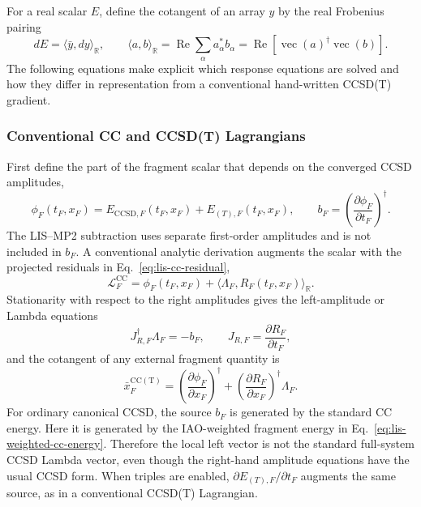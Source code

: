 \documentclass[11pt]{article}
\begin{document}
For a real scalar $E$, define the cotangent of an array $y$ by the real
Frobenius pairing
\begin{equation}
 dE=\langle\bar y,dy\rangle_{\mathbb R},
 \qquad
 \langle a,b\rangle_{\mathbb R}
 =\operatorname{Re}\sum_\alpha a_\alpha^*b_\alpha
 =\operatorname{Re}\!\left[\operatorname{vec}(a)^\dagger
                              \operatorname{vec}(b)\right].
 \label{eq:cc-real-cotangent}
\end{equation}
The following equations make explicit which response equations are solved and
how they differ in representation from a conventional hand-written
CCSD(T) gradient.

\subsubsection{Conventional CC and CCSD(T) Lagrangians}

First define the part of the fragment scalar that depends on the converged
CCSD amplitudes,
\begin{equation}
 \phi_F(t_F,x_F)=E_{\mathrm{CCSD},F}(t_F,x_F)
                  +E_{(T),F}(t_F,x_F),
 \qquad
 b_F=\left(\frac{\partial\phi_F}{\partial t_F}\right)^\dagger .
 \label{eq:cc-fragment-objective}
\end{equation}
The LIS--MP2 subtraction uses separate first-order amplitudes and is not
included in $b_F$.  A conventional analytic derivation augments the scalar
with the projected residuals in Eq.~\eqref{eq:lis-cc-residual},
\begin{equation}
 \mathcal L_F^{\mathrm{CC}}
 =\phi_F(t_F,x_F)
  +\langle\Lambda_F,R_F(t_F,x_F)\rangle_{\mathbb R}.
 \label{eq:conventional-cc-lagrangian}
\end{equation}
Stationarity with respect to the right amplitudes gives the left-amplitude
or Lambda equations
\begin{equation}
 J_{R,F}^\dagger\Lambda_F=-b_F,
 \qquad
 J_{R,F}=\frac{\partial R_F}{\partial t_F},
 \label{eq:conventional-cc-adjoint}
\end{equation}
and the cotangent of any external fragment quantity is
\begin{equation}
 \bar x_F^{\mathrm{CC(T)}}
 =\left(\frac{\partial\phi_F}{\partial x_F}\right)^\dagger
  +\left(\frac{\partial R_F}{\partial x_F}\right)^\dagger\Lambda_F.
 \label{eq:conventional-cc-response}
\end{equation}
For ordinary canonical CCSD, the source $b_F$ is generated by the standard
CC energy.  Here it is generated by the IAO-weighted fragment energy in
Eq.~\eqref{eq:lis-weighted-cc-energy}.  Therefore the local left vector is
not the standard full-system CCSD Lambda vector, even though the right-hand
amplitude equations have the usual CCSD form.  When triples are enabled,
$\partial E_{(T),F}/\partial t_F$ augments the same source, as in a
conventional CCSD(T) Lagrangian.
\end{document}
